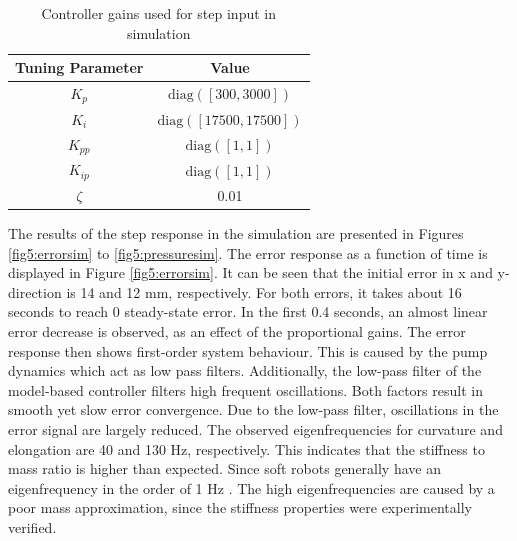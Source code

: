 \begin{table}[H]
    \centering
    \begin{tabular}{|c|c|} \hline
     \textbf{Tuning Parameter}    & \textbf{Value}  \\ \hline
    $K_p$ & $\text{diag}([300,3000])$  \\ \hline
    $K_i$ & $\text{diag}([17500,17500])$  \\ \hline
    $K_{pp}$ & $\text{diag}([1,1])$  \\ \hline
    $K_{ip}$ & $\text{diag}([1,1])$ \\ \hline
    $\zeta$ & 0.01 \\ \hline
    \end{tabular}
    \caption{Controller gains used for step input in simulation}
    \label{tab5:gainssim}
\end{table}


The results of the step response in the simulation are presented in Figures \ref{fig5:errorsim} to \ref{fig5:pressuresim}. The error response as a function of time is displayed in Figure \ref{fig5:errorsim}. It can be seen that the initial error in x and y-direction is 14 and 12 mm, respectively. For both errors, it takes about 16 seconds to reach 0 steady-state error. In the first 0.4 seconds, an almost linear error decrease is observed, as an effect of the proportional gains. The error response then shows first-order system behaviour. This is caused by the pump dynamics which act as low pass filters. Additionally, the low-pass filter of the model-based controller filters high frequent oscillations. Both factors result in smooth yet slow error convergence. Due to the low-pass filter, oscillations in the error signal are largely reduced. The observed eigenfrequencies for curvature and elongation are 40 and 130 Hz, respectively. This indicates that the stiffness to mass ratio is higher than expected. Since soft robots generally have an eigenfrequency in the order of 1 Hz \cite{tawk2018bioinspired}. The high eigenfrequencies are caused by a poor mass approximation, since the stiffness properties were experimentally verified.




